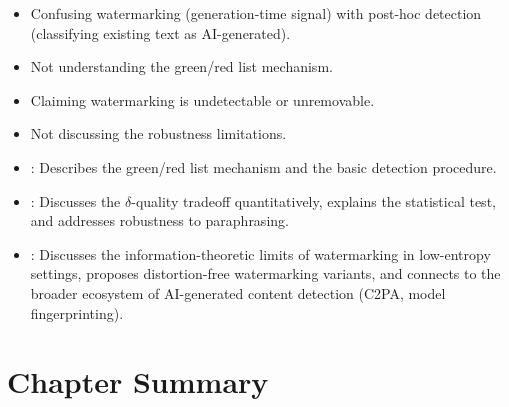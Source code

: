 \begin{interviewq}
\redflags
\begin{itemize}
    \item Confusing watermarking (generation-time signal) with post-hoc
    detection (classifying existing text as AI-generated).
    \item Not understanding the green/red list mechanism.
    \item Claiming watermarking is undetectable or unremovable.
    \item Not discussing the robustness limitations.
\end{itemize}


\goodgreat
\begin{itemize}
    \item {}: Describes the green/red list mechanism and the
    basic detection procedure.
    \item {}: Discusses the $\delta$-quality tradeoff
    quantitatively, explains the statistical test, and addresses robustness
    to paraphrasing.
    \item {}: Discusses the information-theoretic limits of
    watermarking in low-entropy settings, proposes distortion-free watermarking
    variants, and connects to the broader ecosystem of AI-generated content
    detection (C2PA, model fingerprinting).
\end{itemize}

\end{interviewq}

\bigskip

\section*{Chapter Summary}

